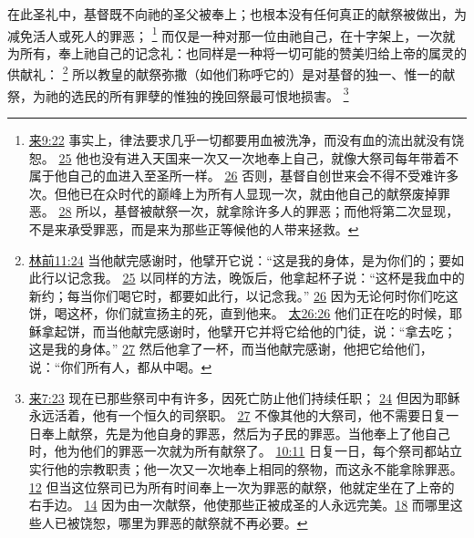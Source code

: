 \documentclass[12pt, a4paper, oneside]{ctexart}
\newcounter{parnum}[section]
\newcommand{\N}{%
   \noindent\refstepcounter{parnum}%
    \makebox[\parindent][l]{\textbf{\arabic{parnum}.}}}
\begin{document}
\N 在此圣礼中，基督既不向祂的圣父被奉上；也根本没有任何真正的献祭被做出，为减免活人或死人的罪恶；
	\footnote {
		\href{https://biblehub.com/hebrews/9-22.htm}{来9:22} 事实上，律法要求几乎一切都要用血被洗净，而没有血的流出就没有饶恕。
		\href{https://biblehub.com/hebrews/9-25.htm}{25} 他也没有进入天国来一次又一次地奉上自己，就像大祭司每年带着不属于他自己的血进入至圣所一样。
		\href{https://biblehub.com/hebrews/9-26.htm}{26} 否则，基督自创世来会不得不受难许多次。但他已在众时代的巅峰上为所有人显现一次，就由他自己的献祭废掉罪恶。
		\href{https://biblehub.com/hebrews/9-28.htm}{28} 所以，基督被献祭一次，就拿除许多人的罪恶；而他将第二次显现，不是来承受罪恶，而是来为那些正等候他的人带来拯救。
	}
	而仅是一种对那一位由祂自己，在十字架上，一次就为所有，奉上祂自己的记念礼：也同样是一种将一切可能的赞美归给上帝的属灵的供献礼：
	\footnote {
		\href{https://biblehub.com/1_corinthians/11-24.htm}{林前11:24} 当他献完感谢时，他擘开它说：“这是我的身体，是为你们的；要如此行以记念我。
		\href{https://biblehub.com/1_corinthians/11-25.htm}{25} 以同样的方法，晚饭后，他拿起杯子说：“这杯是我血中的新约；每当你们喝它时，都要如此行，以记念我。”
		\href{https://biblehub.com/1_corinthians/11-26.htm}{26} 因为无论何时你们吃这饼，喝这杯，你们就宣扬主的死，直到他来。
		\href{https://biblehub.com/matthew/26-26.htm}{太26:26} 他们正在吃的时候，耶稣拿起饼，而当他献完感谢时，他擘开它并将它给他的门徒，说：“拿去吃；这是我的身体。”
		\href{https://biblehub.com/matthew/26-27.htm}{27} 然后他拿了一杯，而当他献完感谢，他把它给他们，说：“你们所有人，都从中喝。
	}
	所以教皇的献祭弥撒（如他们称呼它的）是对基督的独一、惟一的献祭，为祂的选民的所有罪孽的惟独的挽回祭最可恨地损害。
	\footnote {
		\href{https://biblehub.com/hebrews/7-23.htm}{来7:23} 现在已那些祭司中有许多，因死亡防止他们持续任职；
		\href{https://biblehub.com/hebrews/7-24.htm}{24} 但因为耶稣永远活着，他有一个恒久的司祭职。
		\href{https://biblehub.com/hebrews/7-27.htm}{27} 不像其他的大祭司，他不需要日复一日奉上献祭，先是为他自身的罪恶，然后为子民的罪恶。当他奉上了他自己时，他为他们的罪恶一次就为所有献祭了。
		\href{https://biblehub.com/hebrews/10-11.htm}{10:11} 日复一日，每个祭司都站立实行他的宗教职责；他一次又一次地奉上相同的祭物，而这永不能拿除罪恶。
		\href{https://biblehub.com/hebrews/10-12.htm}{12} 但当这位祭司已为所有时间奉上一次为罪恶的献祭，他就定坐在了上帝的右手边。
		\href{https://biblehub.com/hebrews/10-14.htm}{14} 因为由一次献祭，他使那些正被成圣的人永远完美。\href{https://biblehub.com/hebrews/10-18.htm}{18} 而哪里这些人已被饶恕，哪里为罪恶的献祭就不再必要。
	}
\end{document}
